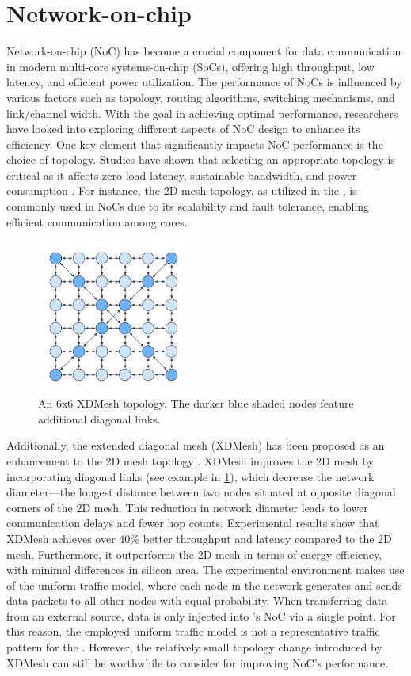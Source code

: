 \section{Network-on-chip}
Network-on-chip (NoC) has become a crucial component for data communication in modern multi-core systems-on-chip (SoCs), offering high throughput, low latency, and efficient power utilization.
The performance of NoCs is influenced by various factors such as topology, routing algorithms, switching mechanisms, and link/channel width.
With the goal in achieving optimal performance, researchers have looked into exploring different aspects of NoC design to enhance its efficiency.
One key element that significantly impacts NoC performance is the choice of topology.
Studies have shown that selecting an appropriate topology is critical as it affects zero-load latency, sustainable bandwidth, and power consumption \cite{chenPhysicalVsVirtual2010}.
For instance, the 2D mesh topology, as utilized in the \graicore{}, is commonly used in NoCs due to its scalability and fault tolerance, enabling efficient communication among cores.

\begin{figure}[htbp]
\centering
\includegraphics[width=0.45\textwidth]{assets/xdmesh_topology.pdf}
\caption{
An 6x6 XDMesh topology.
The darker blue shaded nodes feature additional diagonal links.
}
\label{fig:xdmesh_topology}
\end{figure}

Additionally, the extended diagonal mesh (XDMesh) has been proposed as an enhancement to the 2D mesh topology \cite{furhadExtendedDiagonalMesh2015}.
XDMesh improves the 2D mesh by incorporating diagonal links (see example in \cref{fig:xdmesh_topology}), which decrease the network diameter---the longest distance between two nodes situated at opposite diagonal corners of the 2D mesh.
This reduction in network diameter leads to lower communication delays and fewer hop counts.
Experimental results show that XDMesh achieves over $40\%$ better throughput and latency compared to the 2D mesh.
Furthermore, it outperforms the 2D mesh in terms of energy efficiency, with minimal differences in silicon area.
The experimental environment makes use of the uniform traffic model, where each node in the network generates and sends data packets to all other nodes with equal probability.
When transferring data from an external source, data is only injected into \graicore{}'s NoC via a single point.
For this reason, the employed uniform traffic model is not a representative traffic pattern for the \confignoc{}. 
However, the relatively small topology change introduced by XDMesh can still be worthwhile to consider for improving NoC's performance.

